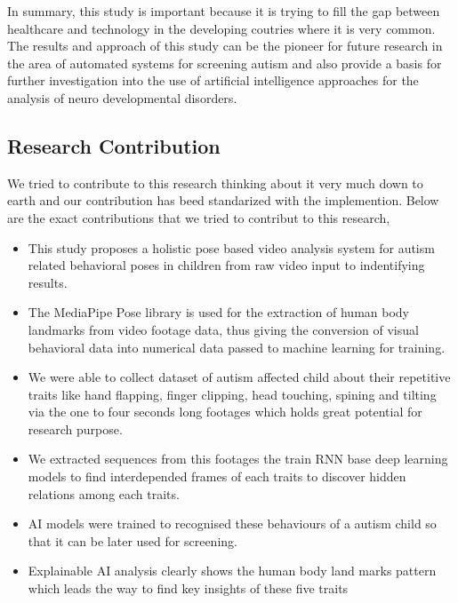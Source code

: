 In summary, this study is important because it is trying to fill the gap between healthcare and technology in the developing coutries where it is very common. The results and approach of this study can be the pioneer for future research in the area of automated systems for screening autism and also provide a basis for further investigation into the use of artificial intelligence approaches for the analysis of neuro developmental disorders.
\subsection{Research Contribution}
We tried to contribute to this research thinking about it very much down to earth and our contribution has beed standarized with the implemention. Below are the exact contributions that we tried to contribut to this research,
\begin{itemize}
    \item This study proposes a holistic pose based video analysis system for autism related behavioral poses in children from raw video input to indentifying results.
    
    \item The MediaPipe Pose library is used for the extraction of human body landmarks from video footage data, thus giving the conversion of visual behavioral data into numerical data passed to machine learning for training.
    
    \item We were able to collect dataset of autism affected child about their repetitive traits like hand flapping, finger clipping, head touching, spining and tilting via the one to four seconds long footages which holds great potential for research purpose.

    \item We extracted sequences from this footages the train RNN base deep learning models to find interdepended frames of each traits to discover hidden relations among each traits.
    
    \item AI models were trained to recognised these behaviours of a autism child so that it can be later used for screening.
    
    \item Explainable AI analysis clearly shows the human body land marks pattern which leads the way to find key insights of these five traits
\end{itemize}



